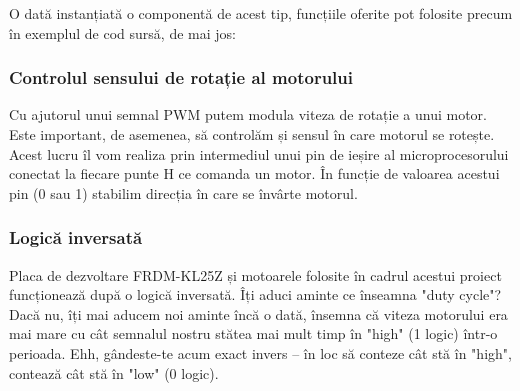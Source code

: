 O dată instanțiată o componentă de acest tip, funcțiile oferite pot folosite precum în exemplul de cod sursă, de mai jos:



\subsubsection{Controlul sensului de rotație al motorului}

Cu ajutorul unui semnal PWM putem modula viteza de rotație a unui motor. Este important, de asemenea, să controlăm și sensul în care motorul se rotește. Acest lucru îl vom realiza prin intermediul unui pin de ieșire al microprocesorului conectat la fiecare punte H ce comanda un motor. În funcție de valoarea acestui pin (0 sau 1) stabilim direcția în care se învârte motorul.

\subsubsection{Logică inversată}

Placa de dezvoltare FRDM-KL25Z și motoarele folosite în cadrul acestui proiect funcționează după o logică inversată. Îți aduci aminte ce înseamna "duty cycle"? Dacă nu, îți mai aducem noi aminte încă o dată, însemna că viteza motorului era mai mare cu cât semnalul nostru stătea mai mult timp în "high" (1 logic) într-o perioada. Ehh, gândeste-te acum exact invers – în loc să conteze cât stă în "high", contează cât stă în "low" (0 logic).

